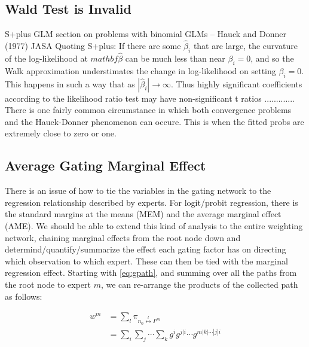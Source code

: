 \documentclass[12pt]{article}
\begin{document}
\subsection{Wald Test is Invalid}
S+plus GLM section on problems with binomial GLMs
  -- Hauck and Donner (1977) JASA \cite{HauckDonner} Quoting S+plus: If there are some $\hat{\beta}_{i}$ that are large, the curvature of the log-likelihood at $mathbf{\hat{\beta}}$ can be much less than near $\beta_{i}=0$, and so the Walk approximation understimates the change in log-likelihood on setting $\beta_{i}=0$. This happens in such a way that as $|\hat{\beta}_{i}| \rightarrow \infty$. Thus highly significant coefficients according to the likelihood ratio test may have non-significant t ratios ............. There is one fairly common circumstance in which both convergence problems and the Hauek-Donner phenomenon can occure. This is when the fitted probs are extremely close to zero or one.


\subsection{Average Gating Marginal Effect}
There is an issue of how to tie the variables in the gating network to the regression relationship described by experts. For logit/probit regression, there is the standard margins at the means (MEM) and the average marginal effect (AME). We should be able to extend this kind of analysis to the entire weighting network, chaining marginal effects from the root node down and determind/quantify/summarize the effect each gating factor has on directing which observation to which expert. These can then be tied with the marginal regression effect. Starting with \ref{eq:gpath}, and summing over all the paths from the root node to expert $m$, we can re-arrange the products of the collected path as follows:  

\begin{equation}
  \begin{split}
  w^{m} &= \sum_{l} \pi_{n_{0} \overset{l}{\longleftrightarrow} P^{m}} \\
        &= \sum_{i} \sum_{j} \cdots \sum_{k} g^{i} g^{j|i} \cdots g^{m|k|\cdots|j|i} \\
  \end{split}
\end{equation}
\end{document}
